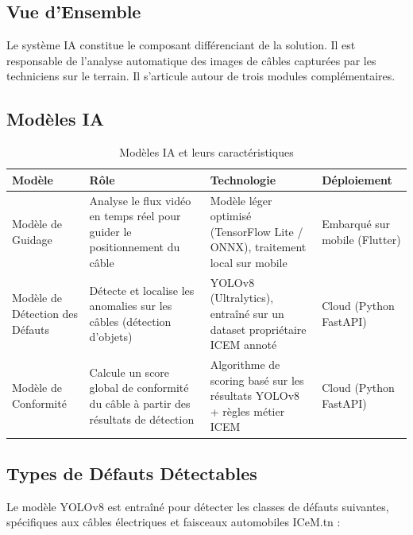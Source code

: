 \subsection{Vue d'Ensemble}

Le système IA constitue le composant différenciant de la solution. Il est responsable de l'analyse automatique des images de câbles capturées par les techniciens sur le terrain. Il s'articule autour de trois modules complémentaires.

\subsection{Modèles IA}

\begin{table}[H]
\centering
\caption{Modèles IA et leurs caractéristiques}
\label{tab:modeles-ia}
\renewcommand{\arraystretch}{1.4}
\begin{tabularx}{\textwidth}{|l|X|X|l|}
\hline
\textbf{Modèle} & \textbf{Rôle} & \textbf{Technologie} & \textbf{Déploiement} \\
\hline
Modèle de Guidage
  & Analyse le flux vidéo en temps réel pour guider le positionnement du câble
  & Modèle léger optimisé (TensorFlow Lite / ONNX), traitement local sur mobile
  & Embarqué sur mobile (Flutter) \\
\hline
Modèle de Détection des Défauts
  & Détecte et localise les anomalies sur les câbles (détection d'objets)
  & YOLOv8 (Ultralytics), entraîné sur un dataset propriétaire ICEM annoté
  & Cloud (Python FastAPI) \\
\hline
Modèle de Conformité
  & Calcule un score global de conformité du câble à partir des résultats de détection
  & Algorithme de scoring basé sur les résultats YOLOv8 + règles métier ICEM
  & Cloud (Python FastAPI) \\
\hline
\end{tabularx}
\end{table}

\subsection{Types de Défauts Détectables}

Le modèle YOLOv8 est entraîné pour détecter les classes de défauts suivantes, spécifiques aux câbles électriques et faisceaux automobiles ICeM.tn :

